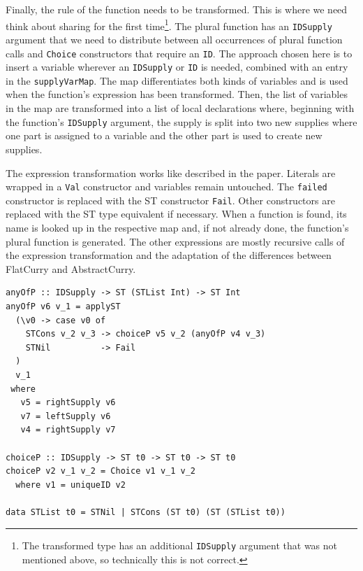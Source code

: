 \documentclass[a4paper, 11pt, fleqn]{scrreprt}
\newcommand{\cinline}[1]{\texttt{#1}}
\begin{document}
Finally, the rule of the function needs to be transformed. This is where we need think about sharing for the first time\footnote{The transformed type has an additional \cinline{IDSupply} argument that was not mentioned above, so technically this is not correct.}. The plural function has an \cinline{IDSupply} argument that we need to distribute between all occurrences of plural function calls and \cinline{Choice} constructors that require an \cinline{ID}. The approach chosen here is to insert a variable wherever an \cinline{IDSupply} or \cinline{ID} is needed, combined with an entry in the \cinline{supplyVarMap}. The map differentiates both kinds of variables and is used when the function's expression has been transformed. Then, the list of variables in the map are transformed into a list of local declarations where, beginning with the function's \cinline{IDSupply} argument, the supply is split into two new supplies where one part is assigned to a variable and the other part is used to create new supplies.

The expression transformation works like described in the paper. Literals are wrapped in a \cinline{Val} constructor and variables remain untouched. The \cinline{failed} constructor is replaced with the ST constructor \cinline{Fail}. Other constructors are replaced with the ST type equivalent if necessary. When a function is found, its name is looked up in the respective map and, if not already done, the function's plural function is generated. The other expressions are mostly recursive calls of the expression transformation and the adaptation of the differences between FlatCurry and AbstractCurry.

\begin{verbatim}
anyOfP :: IDSupply -> ST (STList Int) -> ST Int
anyOfP v6 v_1 = applyST
  (\v0 -> case v0 of
    STCons v_2 v_3 -> choiceP v5 v_2 (anyOfP v4 v_3)
    STNil          -> Fail
  )
  v_1
 where
   v5 = rightSupply v6
   v7 = leftSupply v6
   v4 = rightSupply v7

choiceP :: IDSupply -> ST t0 -> ST t0 -> ST t0
choiceP v2 v_1 v_2 = Choice v1 v_1 v_2
  where v1 = uniqueID v2

data STList t0 = STNil | STCons (ST t0) (ST (STList t0))
\end{verbatim}
\end{document}
